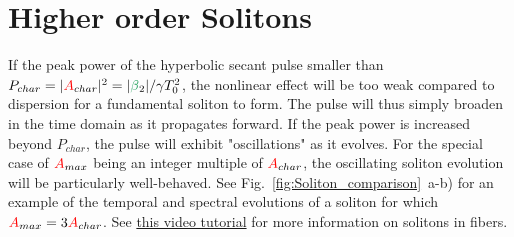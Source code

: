 \section{Higher order Solitons}
If the peak power of the hyperbolic secant pulse smaller than $P_{char}=|\A_{char}|^2=|\betag_2|/\gamma T_0^2$, the nonlinear effect will be too weak compared to dispersion for a fundamental soliton to form. The pulse will thus simply broaden in the time domain as it propagates forward. If the peak power is increased beyond $P_{char}$, the pulse will exhibit "oscillations" as it evolves. For the special case of $\textcolor{red}{A}_{max}$ being an integer multiple of $\textcolor{red}{A}_{char}$, the oscillating soliton evolution will be particularly well-behaved. See Fig.~\ref{fig:Soliton_comparison}~a-b) for an example of the temporal and spectral evolutions of a soliton for which $\textcolor{red}{A}_{max}=3\textcolor{red}{A}_{char}$. See \href{https://youtu.be/KAZ7pCQ-x8Y}{this video tutorial} for more information on solitons in fibers. 


